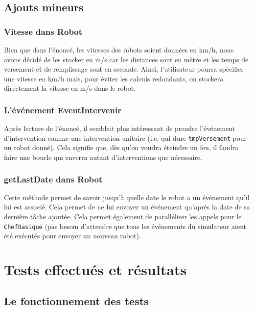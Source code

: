 \documentclass[a4paper,10pt]{article} %
\begin{document}
\subsection{Ajouts mineurs}
\subsubsection{Vitesse dans Robot}
Bien que dans l'énoncé, les vitesses des robots soient données en km/h, nous avons décidé de les stocker en m/s
car les distances sont en mètre et les temps de versement et de remplissage sont en seconde. Ainsi, l'utilisateur pourra spécifier une 
vitesse en km/h mais, pour éviter les calculs redondants, on stockera directement la vitesse en m/s dans le robot.
\subsubsection{L'événement EventIntervenir}
Après lecture de l'énoncé, il semblait plus intéressant de prendre l'événement d'intervention comme une intervention unitaire
(i.e. qui dure \texttt{tmpVersement} pour un robot donné). Cela signifie que, dès qu'on voudra éteindre un feu, il faudra faire une 
boucle qui enverra autant d'interventions que nécessaire.
\subsubsection{getLastDate dans Robot}
Cette méthode permet de savoir jusqu'à quelle date le robot a un événement qu'il lui est associé. Cela permet de ne lui envoyer un événement
qu'après la date de sa dernière tâche ajoutée. Cela permet également de paralléliser les appels pour le \texttt{ChefBasique} 
(pas besoin d'attendre que tous les événements du simulateur aient été exécutés pour envoyer un nouveau robot).

\section{Tests effectués et résultats}
\subsection{Le fonctionnement des tests}
\end{document}
